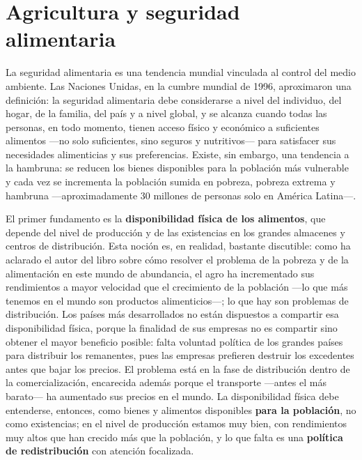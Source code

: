 \documentclass[
  man,
  floatsintext,
  longtable,
  a4paper,
  nolmodern,
  notxfonts,
  notimes,
  12pt,
  colorlinks=true,linkcolor=blue,citecolor=blue,urlcolor=blue]{apa7}
\begin{document}
\section{Agricultura y seguridad
alimentaria}\label{agricultura-y-seguridad-alimentaria}

La seguridad alimentaria es una tendencia mundial vinculada al control
del medio ambiente. Las Naciones Unidas, en la cumbre mundial de 1996,
aproximaron una definición: la seguridad alimentaria debe considerarse a
nivel del individuo, del hogar, de la familia, del país y a nivel
global, y se alcanza cuando todas las personas, en todo momento, tienen
acceso físico y económico a suficientes alimentos ---no solo
suficientes, sino seguros y nutritivos--- para satisfacer sus
necesidades alimenticias y sus preferencias. Existe, sin embargo, una
tendencia a la hambruna: se reducen los bienes disponibles para la
población más vulnerable y cada vez se incrementa la población sumida en
pobreza, pobreza extrema y hambruna ---aproximadamente 30 millones de
personas solo en América Latina---.

El primer fundamento es la \textbf{disponibilidad física de los
alimentos}, que depende del nivel de producción y de las existencias en
los grandes almacenes y centros de distribución. Esta noción es, en
realidad, bastante discutible: como ha aclarado el autor del libro sobre
cómo resolver el problema de la pobreza y de la alimentación en este
mundo de abundancia, el agro ha incrementado sus rendimientos a mayor
velocidad que el crecimiento de la población ---lo que más tenemos en el
mundo son productos alimenticios---; lo que hay son problemas de
distribución. Los países más desarrollados no están dispuestos a
compartir esa disponibilidad física, porque la finalidad de sus empresas
no es compartir sino obtener el mayor beneficio posible: falta voluntad
política de los grandes países para distribuir los remanentes, pues las
empresas prefieren destruir los excedentes antes que bajar los precios.
El problema está en la fase de distribución dentro de la
comercialización, encarecida además porque el transporte ---antes el más
barato--- ha aumentado sus precios en el mundo. La disponibilidad física
debe entenderse, entonces, como bienes y alimentos disponibles
\textbf{para la población}, no como existencias; en el nivel de
producción estamos muy bien, con rendimientos muy altos que han crecido
más que la población, y lo que falta es una \textbf{política de
redistribución} con atención focalizada.
\end{document}
